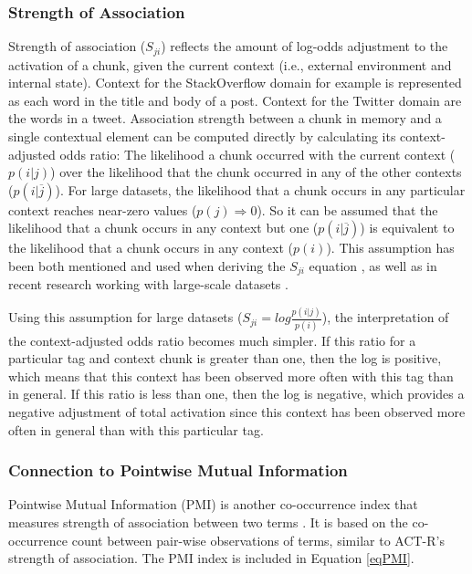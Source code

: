 \documentclass[man,floatsintext,donotrepeattitle]{apa6}
\begin{document}
\subsubsection{Strength of Association}

Strength of association ($S_{ji}$) reflects the amount of log-odds adjustment to the activation of a chunk, given the current context (i.e., external environment and internal state).
Context for the StackOverflow domain for example is represented as each word in the title and body of a post.
Context for the Twitter domain are the words in a tweet.
Association strength between a chunk in memory and a single contextual element can be computed directly by calculating its context-adjusted odds ratio:
The likelihood a chunk occurred with the current context ($p(i|j)$) over the likelihood that the chunk occurred in any of the other contexts ($p(i|\overline{j})$).
For large datasets, the likelihood that a chunk occurs in any particular context reaches near-zero values ($p(j) \Rightarrow 0$).
So it can be assumed that the likelihood that a chunk occurs in any context but one ($p(i|\overline{j})$) is equivalent to the likelihood that a chunk occurs in any context ($p(i)$).
This assumption has been both mentioned and used when deriving the $S_{ji}$ equation \parencite{Anderson1989}, as well as in recent research working with large-scale datasets \parencite{Stanley2013}.

Using this assumption for large datasets ($S_{ji} = log \frac{p(i|j)}{p(i)}$), the interpretation of the context-adjusted odds ratio becomes much simpler.
If this ratio for a particular tag and context chunk is greater than one, then the log is positive, which means that this context has been observed more often with this tag than in general.
If this ratio is less than one, then the log is negative, which provides a negative adjustment of total activation since this context has been observed more often in general than with this particular tag.

\subsubsection{Connection to Pointwise Mutual Information}

Pointwise Mutual Information (PMI) is another co-occurrence index that measures strength of association between two terms \parencite{Farahat2004}.
It is based on the co-occurrence count between pair-wise observations of terms, similar to ACT-R's strength of association.
The PMI index is included in Equation \eqref{eqPMI}.
\end{document}
